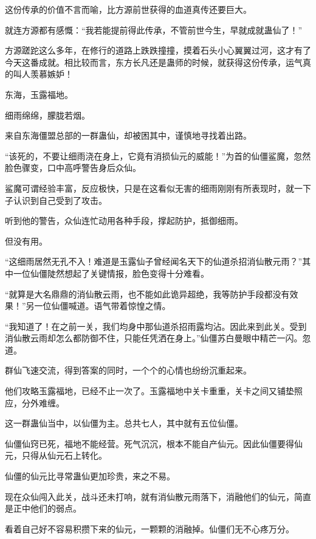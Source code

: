 
\begin{this_body}

这份传承的价值不言而喻，比方源前世获得的血道真传还要巨大。

就连方源都有感慨：“我若能提前得此传承，不管前世今生，早就成就蛊仙了！”

方源蹉跎这么多年，在修行的道路上跌跌撞撞，摸着石头小心翼翼过河，这才有了今天这番成就。相比较而言，东方长凡还是蛊师的时候，就获得这份传承，运气真的叫人羡慕嫉妒！

东海，玉露福地。

细雨绵绵，朦胧若烟。

来自东海僵盟总部的一群蛊仙，却被困其中，谨慎地寻找着出路。

“该死的，不要让细雨浇在身上，它竟有消损仙元的威能！”为首的仙僵鲨魔，忽然脸色骤变，口中高呼警告身后众仙。

鲨魔可谓经验丰富，反应极快，只是在这看似无害的细雨刚刚有所表现时，就一下子认识到自己受到了攻击。

听到他的警告，众仙连忙动用各种手段，撑起防护，抵御细雨。

但没有用。

“这细雨居然无孔不入！难道是玉露仙子曾经闻名天下的仙道杀招消仙散元雨？”其中一位仙僵陡然想起了关键情报，脸色变得十分难看。

“就算是大名鼎鼎的消仙散云雨，也不能如此诡异超绝，我等防护手段都没有效果！”另一位仙僵喊道。语气带着惊惶之情。

“我知道了！在之前一关，我们均身中那仙道杀招雨露均沾。因此来到此关。受到消仙散云雨却怎么都防御不住，只能任凭洒在身上。”仙僵苏白曼眼中精芒一闪。忽道。

群仙飞速交流，得到答案的同时，一个个的心情也纷纷沉重起来。

他们攻略玉露福地，已经不止一次了。玉露福地中关卡重重，关卡之间又铺垫照应，分外难缠。

这一群蛊仙当中，以仙僵为主。总共七人，其中就有五位仙僵。

仙僵仙窍已死，福地不能经营。死气沉沉，根本不能自产仙元。因此仙僵要得仙元，只得从仙元石上转化。

仙僵的仙元比寻常蛊仙更加珍贵，来之不易。

现在众仙闯入此关，战斗还未打响，就有消仙散元雨落下，消融他们的仙元，简直是正中他们的弱点。

看着自己好不容易积攒下来的仙元，一颗颗的消融掉。仙僵们无不心疼万分。


\end{this_body}
